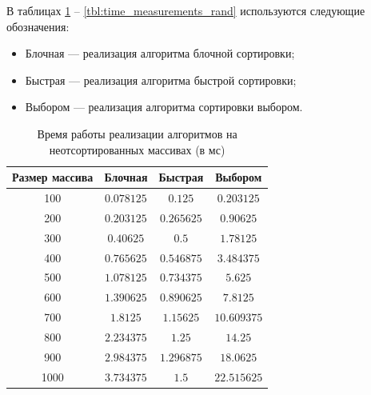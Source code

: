 В таблицах \ref{tbl:time_measurements} -- \ref{tbl:time_measurements_rand} используются следующие обозначения: 
\begin{itemize}
	\item Блочная --- реализация алгоритма блочной сортировки;
	\item Быстрая --- реализация алгоритма быстрой сортировки;
	\item Выбором --- реализация алгоритма сортировки выбором.
\end{itemize}

\begin{table}[h]
	\begin{center}
		\begin{threeparttable}
			\captionsetup{justification=raggedright,singlelinecheck=off}
			\caption{Время работы реализации алгоритмов на неотсортированных массивах (в мс)}
			\label{tbl:time_measurements}
			\begin{tabular}{|c|c|c|c|}
				\hline
				Размер массива & Блочная & Быстрая & Выбором \\
				\hline
				100 &$ 0.078125 $&$ 0.125 $&$ 0.203125 $\\
				\hline
				200 &$ 0.203125 $&$ 0.265625 $&$ 0.90625 $\\
				\hline
				300 &$ 0.40625 $&$ 0.5 $&$ 1.78125 $\\
				\hline
				400 &$ 0.765625 $&$ 0.546875 $&$ 3.484375 $\\
				\hline
				500 &$ 1.078125 $&$ 0.734375 $&$ 5.625 $\\
				\hline
				600 &$ 1.390625 $&$ 0.890625 $&$ 7.8125 $\\
				\hline
				700 &$ 1.8125 $&$ 1.15625 $&$ 10.609375 $\\
				\hline
				800 &$ 2.234375 $&$ 1.25 $&$ 14.25 $\\
				\hline
				900 &$ 2.984375 $&$ 1.296875 $&$ 18.0625 $\\
				\hline
				1000 &$ 3.734375 $&$ 1.5 $&$ 22.515625 $\\
				\hline
			\end{tabular}
		\end{threeparttable}
	\end{center}
\end{table}

